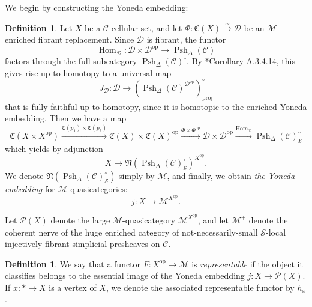 \documentclass[a4paper]{article}
\numberwithin{equation}{subsection}
\theoremstyle{plain}   %
\theoremstyle{definition}
\newtheorem{defn}[equation]{Definition}
\theoremstyle{remark}
\theoremstyle{plain}
\newcommand{\op}{\ensuremath{\mathrm{op}}}
\DeclareMathOperator{\Hom}{Hom}
\providecommand{\C}{}
\renewcommand{\C}{\ensuremath{\mathcal{C}}}
\newcommand{\M}{\ensuremath{\mathcal{M}}}
\newcommand{\Pre}{\ensuremath{\mathcal{P}}}
\newcommand{\setS}{\ensuremath{\mathscr{S}}}
\newcommand{\spsh}{\ensuremath{\operatorname{Psh}_\Delta(\mathcal{C})}}
\begin{document}
We begin by constructing the Yoneda embedding:
\begin{defn}
	Let \(X\) be a \(\C\)-cellular set, and let \(\Phi:\mathfrak{C}(X) \xrightarrow{\sim} \mathcal{D}\) be an \(\M\)-enriched fibrant replacement.  Since \(\mathcal{D}\) is fibrant, the functor
	\[\Hom_\mathcal{D}: \mathcal{D}\times \mathcal{D}^\op \to \spsh\]
	factors through the full subcategory \(\spsh^\circ\).  By \cite{htt}*{Corollary A.3.4.14}, this gives rise up to homotopy to a universal map
	\[J_\mathcal{D}:\mathcal{D}\to \left(\spsh^{\mathcal{D}^\op}\right)_\mathrm{proj}^\circ\]
	that is fully faithful up to homotopy, since it is homotopic to the enriched Yoneda embedding. 
	Then we have a map
	\[\mathfrak{C}(X\times X^\op) \xrightarrow{\mathfrak{C}(p_1) \times \mathfrak{C}(p_2)} \mathfrak{C}(X) \times \mathfrak{C}(X)^\op \xrightarrow{\Phi \times \Phi^\op} \mathcal{D}\times \mathcal{D}^\op \xrightarrow{\Hom_{\mathcal{D}}} \spsh_\setS^\circ\]
	which yields by adjunction
	\[X \to \mathfrak{N}(\spsh_\setS^\circ)^{X^\op}.\]
	We denote \(\mathfrak{N}(\spsh_\setS^\circ)\) simply by \(\M\), and finally, we obtain \emph{the Yoneda embedding} for \(\M\)-quasicategories:
	\[j:X\to \M^{X^\op}.\]
\end{defn}

Let \(\Pre(X)\) denote the large \(\M\)-quasicategory \(\M^{X^\op}\), and let \(\M^+\) denote the coherent nerve of the huge enriched category of not-necessarily-small \(\setS\)-local injectively fibrant simplicial presheaves on \(\C\).  

\begin{defn} We say that a functor \(F:X^\op \to \M\) is \emph{representable} if the object it classifies belongs to the essential image of the Yoneda embedding \(j:X\to \Pre(X)\).  If \(x:\ast\to X\) is a vertex of \(X\), we denote the associated representable functor by \(h_x\).  
\end{defn}
\end{document}
